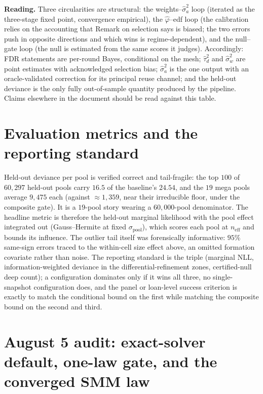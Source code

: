 \documentclass[11pt]{article}
\begin{document}
\medskip
\noindent\textbf{Reading.} Three circularities are structural: the
weights--$\hat\sigma_a^2$ loop (iterated as the three-stage fixed point,
convergence empirical), the $\hat\varphi$--edf loop (the calibration relies
on the accounting that Remark on selection says is biased; the two errors
push in opposite directions and which wins is regime-dependent), and the
null--gate loop (the null is estimated from the same scores it judges).
Accordingly: FDR statements are per-round Bayes, conditional on the mesh;
$\hat\tau_d^2$ and $\hat\sigma_w^2$ are point estimates with acknowledged
selection bias; $\hat\sigma_a^2$ is the one output with an
oracle-validated correction for its principal reuse channel; and the
held-out deviance is the only fully out-of-sample quantity produced by the
pipeline. Claims elsewhere in the document should be read against this
table.

\section{Evaluation metrics and the reporting standard}\label{sec:metrics}

Held-out deviance per pool is verified correct and tail-fragile: the top
$100$ of $60{,}297$ held-out pools carry $16.5$ of the baseline's $24.54$,
and the $19$ mega pools average $9{,}475$ each (against ${\approx}1{,}359$,
near their irreducible floor, under the composite gate). It is a
$19$-pool story wearing a $60{,}000$-pool denominator. The headline metric
is therefore the held-out marginal likelihood with the pool effect
integrated out (Gauss--Hermite at fixed $\sigma_{\mathrm{pool}}$), which
scores each pool at $n_{\mathrm{eff}}$ and bounds its influence. The
outlier tail itself was forensically informative: $95\%$ same-sign errors
traced to the within-cell size effect above, an omitted formation
covariate rather than noise. The reporting standard is the triple
(marginal NLL, information-weighted deviance in the differential-refinement
zones, certified-null deep count); a configuration dominates only if it
wins all three, no single-snapshot configuration does, and the panel or
loan-level success criterion is exactly to match the conditional bound on
the first while matching the composite bound on the second and third.


\section{August 5 audit: exact-solver default, one-law gate, and the converged SMM law}\label{sec:aug5}
\end{document}
